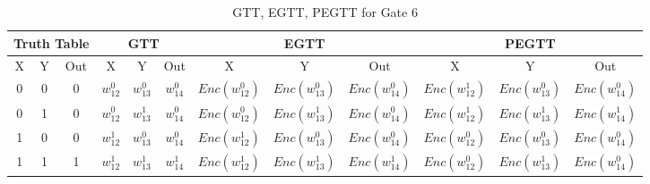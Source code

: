 \documentclass[times]{article}
\begin{document}
	\begin{table}
		\centering
		\caption{GTT, EGTT, PEGTT for Gate 6}
		\label{tab:gtt6}
		\begin{adjustbox}{width=1\textwidth}
		\begin{tabular}{|c|c|c||c|c|c||c|c|c||c|c|c|}
			\hline
			\multicolumn{3}{|c||}{Truth Table} 		& 
				\multicolumn{3}{|c||}{GTT}			& 
					\multicolumn{3}{|c||}{EGTT} 		& 
						\multicolumn{3}{|c|}{PEGTT} \\
			\hline
			\hline
			X & Y & Out	& 
				X & Y & Out	& 
					X & Y & Out	& 
						X & Y & Out	\\
			\hline
			0 & 0 & 0 	&
				$w_{12}^0$	& $w_{13}^0$	& $w_{14}^0$	& 
					$Enc(w_{12}^0)$	& $Enc(w_{13}^0)$	& $Enc(w_{14}^0)$ &
						$Enc(w_{12}^1)$	& $Enc(w_{13}^0)$	& $Enc(w_{14}^0)$ \\
			\hline
			0 & 1 & 0 	&
				$w_{12}^0$	& $w_{13}^1$	& $w_{14}^0$	& 
					$Enc(w_{12}^0)$	& $Enc(w_{13}^1)$	& $Enc(w_{14}^0)$ &
						$Enc(w_{12}^1)$	& $Enc(w_{13}^1)$	& $Enc(w_{14}^1)$ \\
			\hline
			1 & 0 & 0 	&
				$w_{12}^1$	& $w_{13}^0$	& $w_{14}^0$	& 
					$Enc(w_{12}^1)$	& $Enc(w_{13}^0)$	& $Enc(w_{14}^0)$ &
						$Enc(w_{12}^0)$	& $Enc(w_{13}^0)$	& $Enc(w_{14}^0)$ \\
			\hline
			1 & 1 & 1 	&
				$w_{12}^1$	& $w_{13}^1$	& $w_{14}^1$	& 
					$Enc(w_{12}^1)$	& $Enc(w_{13}^1)$	& $Enc(w_{14}^1)$ &
						$Enc(w_{12}^0)$	& $Enc(w_{13}^1)$	& $Enc(w_{14}^0)$ \\
			\hline
		\end{tabular}
		\end{adjustbox}
	\end{table}
	
	
		
\end{document}
